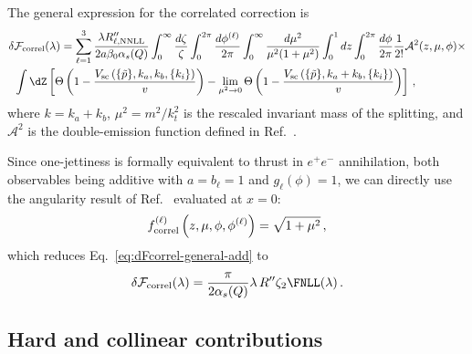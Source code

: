 The general expression for the correlated correction is
\begin{equation}
\begin{aligned}
\label{eq:dFcorrel-general}
\delta&\mathcal{F}_{\mathrm{correl}}(\lambda)=\sum_{\ell=1}^3\frac{\lambda R''_{\ell,\mathrm{NNLL}}}{2a\beta_0\alpha_s(Q)}
\int_0^\infty\frac{d\zeta}{\zeta}\int_0^{2\pi}\frac{d\phi^{(\ell)}}{2\pi}\int_0^\infty
\frac{d\mu^2}{\mu^2(1+\mu^2)}\int_0^1dz\int_0^{2\pi}\frac{d\phi}{2\pi}\frac{1}{2!}\mathcal{A}^2(z,\mu,\phi)\times\\
&\int\dZ\left[ \Theta\left(1-\frac{V_{\mathrm{sc}}\left(\{\tilde{p}\},k_a,k_b,\{k_i\}\right)}{v}\right) - 
\lim_{\mu^2\to0}\Theta\left(1-\frac{V_{\mathrm{sc}}\left(\{\tilde{p}\},k_a+k_b,\{k_i\}\right)}{v}\right) \right]\,,
\end{aligned}
\end{equation}
where $k=k_a+k_b$, $\mu^2=m^2/k_t^2$ is the rescaled invariant mass of the
splitting, and $\mathcal{A}^2$ is the double-emission function defined in
Ref.~\cite{Arpino:2019ozn}. 

Since one-jettiness is formally equivalent to thrust in
$e^+e^-$ annihilation, both observables being additive with
$a=b_\ell=1$ and $g_\ell(\phi)=1$, we can directly use the angularity
result of Ref.~\cite{Banfi:2018mcq} evaluated at $x=0$:
\begin{equation}
 	f^{(\ell)}_{\rm correl}\left(z,\mu,\phi,\phi^{(\ell)}\right)=\sqrt{1+\mu^2}\,,
	\label{eq: f-correl-tau_1}
 \end{equation}
which reduces Eq.~\eqref{eq:dFcorrel-general-add} to
\begin{equation}
\label{eq:dFcorrel-tau_1}
	\delta  \mathcal{F}_{\rm correl}(\lambda)=\frac{\pi}{2\alpha_s(Q)}\lambda\,R'' \zeta_2 \FNLL(\lambda)\,.
\end{equation}

\subsection {Hard and collinear contributions}
\label{sec:hc-contributions}

